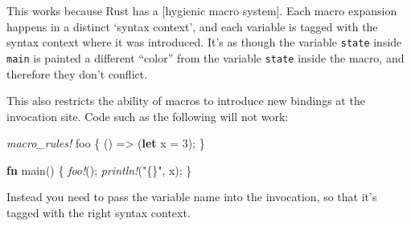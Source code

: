 \documentclass[a4paper,]{book}
\newenvironment{Shaded}{\begin{snugshade}}{\end{snugshade}}
\newcommand{\KeywordTok}[1]{\textcolor[rgb]{0.13,0.29,0.53}{\textbf{{#1}}}}
\newcommand{\DataTypeTok}[1]{\textcolor[rgb]{0.13,0.29,0.53}{{#1}}}
\newcommand{\DecValTok}[1]{\textcolor[rgb]{0.00,0.00,0.81}{{#1}}}
\newcommand{\StringTok}[1]{\textcolor[rgb]{0.31,0.60,0.02}{{#1}}}
\newcommand{\PreprocessorTok}[1]{\textcolor[rgb]{0.56,0.35,0.01}{\textit{{#1}}}}
\newcommand{\NormalTok}[1]{{#1}}
\begin{document}
\begin{Shaded}
\end{Shaded}

This works because Rust has a {[}hygienic macro system{]}. Each macro
expansion happens in a distinct `syntax context', and each variable is
tagged with the syntax context where it was introduced. It's as though
the variable \texttt{state} inside \texttt{main} is painted a different
``color'' from the variable \texttt{state} inside the macro, and
therefore they don't conflict.

This also restricts the ability of macros to introduce new bindings at
the invocation site. Code such as the following will not work:

\begin{Shaded}
\begin{Highlighting}[]
\PreprocessorTok{macro_rules!} \NormalTok{foo \{}
    \NormalTok{() => (}\KeywordTok{let} \NormalTok{x = }\DecValTok{3}\NormalTok{);}
\NormalTok{\}}

\KeywordTok{fn} \NormalTok{main() \{}
    \PreprocessorTok{foo!}\NormalTok{();}
    \PreprocessorTok{println!}\NormalTok{(}\StringTok{"\{\}"}\NormalTok{, x);}
\NormalTok{\}}
\end{Highlighting}
\end{Shaded}

Instead you need to pass the variable name into the invocation, so that
it's tagged with the right syntax context.

\begin{Shaded}
\end{Shaded}
\end{document}
